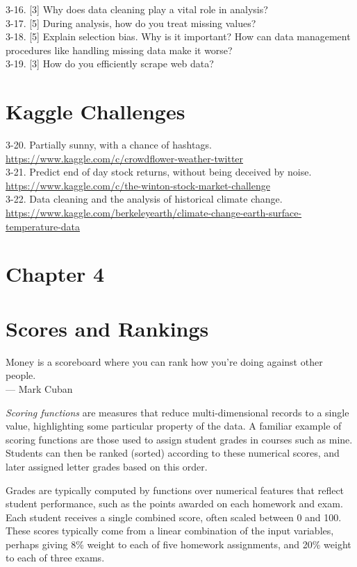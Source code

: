 \documentclass[10pt]{article}
\begin{document}
3-16. [3] Why does data cleaning play a vital role in analysis?\\
3-17. [5] During analysis, how do you treat missing values?\\
3-18. [5] Explain selection bias. Why is it important? How can data management procedures like handling missing data make it worse?\\
3-19. [3] How do you efficiently scrape web data?

\section*{Kaggle Challenges}
3-20. Partially sunny, with a chance of hashtags. \url{https://www.kaggle.com/c/crowdflower-weather-twitter}\\
3-21. Predict end of day stock returns, without being deceived by noise. \url{https://www.kaggle.com/c/the-winton-stock-market-challenge}\\
3-22. Data cleaning and the analysis of historical climate change. \url{https://www.kaggle.com/berkeleyearth/climate-change-earth-surface-temperature-data}

\section*{Chapter 4}
\section*{Scores and Rankings}
\begin{flushright}
Money is a scoreboard where you can rank how you're doing against other people. 
\\ — Mark Cuban
\end{flushright}

\textit{Scoring functions} are measures that reduce multi-dimensional records to a single value, highlighting some particular property of the data. A familiar example of scoring functions are those used to assign student grades in courses such as mine. Students can then be ranked (sorted) according to these numerical scores, and later assigned letter grades based on this order.

Grades are typically computed by functions over numerical features that reflect student performance, such as the points awarded on each homework and exam. Each student receives a single combined score, often scaled between 0 and 100. These scores typically come from a linear combination of the input variables, perhaps giving 8\% weight to each of five homework assignments, and 20\% weight to each of three exams.
\end{document}
